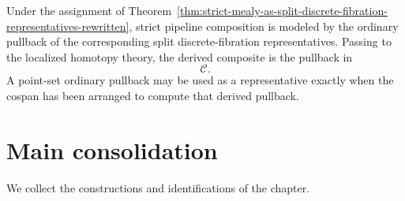 \begin{remark}
\label{rem:strict-pipeline-derived-composition-rewritten}
Under the assignment of
Theorem~\ref{thm:strict-mealy-as-split-discrete-fibration-representatives-rewritten},
strict pipeline composition is modeled by the ordinary pullback of the
corresponding split discrete-fibration representatives. Passing to the
localized homotopy theory, the derived composite is the pullback in
\[
\mathcal C.
\]
A point-set ordinary pullback may be used as a representative exactly
when the cospan has been arranged to compute that derived pullback.
\end{remark}

\section{Main consolidation}
\label{sec:derived-mealy-main-consolidation-rewritten}

We collect the constructions and identifications of the chapter.

